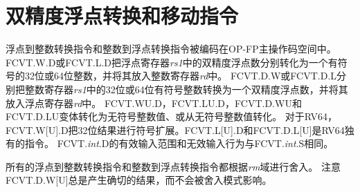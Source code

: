 \section{双精度浮点转换和移动指令}

浮点到整数转换指令和整数到浮点转换指令被编码在OP-FP主操作码空间中。
FCVT.W.D或FCVT.L.D把浮点寄存器{\em rs1}中的双精度浮点数分别转化为一个有符号的32位或64位整数，并将其放入整数寄存器{\em rd}中。
FCVT.D.W或FCVT.D.L分别把整数寄存器{\em rs1}中的32位或64位有符号整数转换为一个双精度浮点数，并将其放入浮点寄存器{\em rd}中。
FCVT.WU.D，FCVT.LU.D，FCVT.D.WU和FCVT.D.LU变体转化为无符号整数值、或从无符号整数值转化。
对于RV64，FCVT.W[U].D把32位结果进行符号扩展。FCVT.L[U].D和FCVT.D.L[U]是RV64独有的指令。
FCVT.{\em int}.D的有效输入范围和无效输入行为与FCVT.{\em int}.S相同。

所有的浮点到整数转换指令和整数到浮点转换指令都根据{\em rm}域进行舍入。
注意FCVT.D.W[U]总是产生确切的结果，而不会被舍入模式影响。

